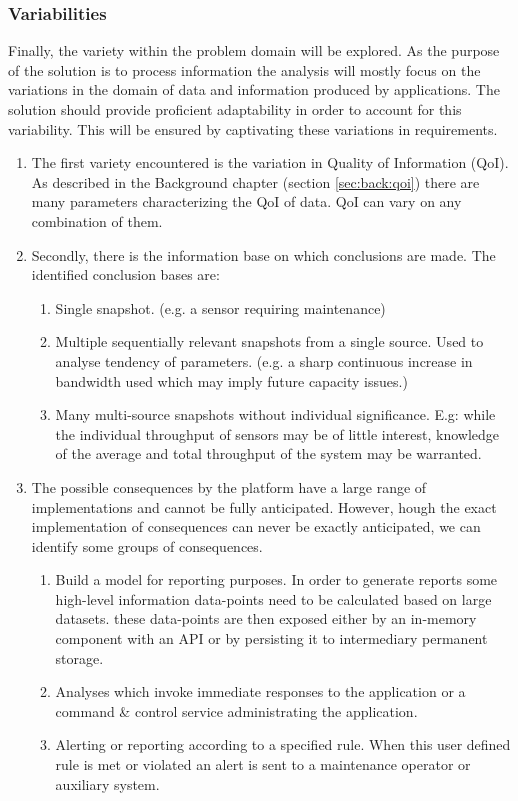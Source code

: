 \subsubsection*{Variabilities}
Finally, the variety within the problem domain will be explored. As the purpose of the solution is to process information the analysis will mostly focus on the variations in the domain of data and information produced by applications. The solution should provide proficient adaptability in order to account for this variability. This will be ensured by captivating these variations in requirements.
\begin{enumerate}[label=V\archid .\arabic*]
\nospace
\item \label{v:qoi} The first variety  encountered is the variation in Quality of Information (QoI). As described in the Background chapter (section \ref{sec:back:qoi}) there are many parameters characterizing the QoI of data. QoI can vary on any combination of them.
\item \label{v:conclusion_basis} Secondly, there is the information base on which conclusions are made. The identified conclusion bases are:
\begin{enumerate}
\nospace
\item Single snapshot. (e.g. a sensor requiring maintenance)
\item Multiple sequentially relevant snapshots from a single source. Used to analyse tendency of parameters. (e.g. a sharp continuous increase in bandwidth used which may imply future capacity issues.)
\item Many multi-source snapshots without individual significance. E.g: while the individual throughput of sensors may be of little interest, knowledge of the average and total throughput of the system may be warranted.
\end{enumerate}
\item \label{v:consequence} The possible consequences by the platform have a large range of implementations and cannot be fully anticipated. However, hough the exact implementation of consequences can never be exactly anticipated, we can identify some groups of consequences.
\begin{enumerate}
\nospace
\item Build a model for reporting purposes. In order to generate reports some high-level information data-points need to be calculated based on large datasets. these data-points are then exposed either by an in-memory component with an API or by persisting it to intermediary permanent storage.
\item Analyses which invoke immediate responses to the application or a command \& control service administrating the application.
\item Alerting or reporting according to a specified rule. When this user defined rule is met or violated an alert is sent to a maintenance operator or auxiliary system.
\end{enumerate}
\end{enumerate}

